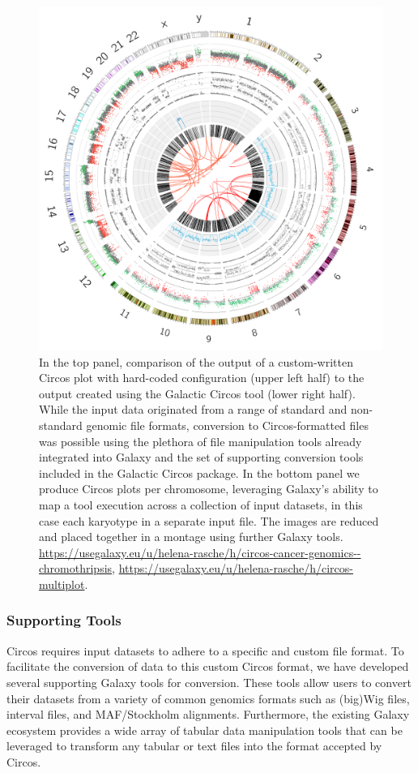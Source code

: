 \begin{figure}[h!]
\centering
\includegraphics[width=0.6\linewidth]{chapters/images/circos/plot-complete-genomics-both.png}
	\caption{In the top panel, comparison of the output of a custom-written Circos plot with hard-coded configuration (upper left half) to the output created using the Galactic Circos tool (lower right half). While the input data originated from a range of standard and non-standard genomic file formats, conversion to Circos-formatted files was possible using the plethora of file manipulation tools already integrated into Galaxy and the set of supporting conversion tools included in the Galactic Circos package. In the bottom panel we produce Circos plots per chromosome, leveraging Galaxy’s ability to map a tool execution across a collection of input datasets, in this case each karyotype in a separate input file. The images are reduced and placed together in a montage using further Galaxy tools. \url{https://usegalaxy.eu/u/helena-rasche/h/circos-cancer-genomics--chromothripsis}, \url{https://usegalaxy.eu/u/helena-rasche/h/circos-multiplot}.}\label{figure:vcap}
\end{figure}


\subsubsection{Supporting Tools}
Circos requires input datasets to adhere to a specific and custom file format. To facilitate the conversion of data to this custom Circos format, we have developed several supporting Galaxy tools for conversion. These tools allow users to convert their datasets from a variety of common genomics formats such as (big)Wig files, interval files, and MAF/Stockholm alignments. Furthermore, the existing Galaxy ecosystem provides a wide array of tabular data manipulation tools that can be leveraged to transform any tabular or text files into the format accepted by Circos.

